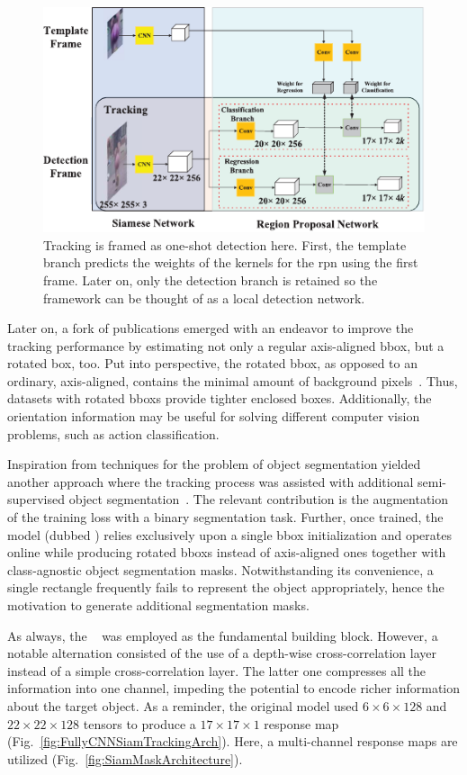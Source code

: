 \begin{figure}[t]
    \centerline{\includegraphics[width=0.7\linewidth]{figures/theoretical_foundations/siam_rpn_one_shot_detection.pdf}}
    \caption[Tracking as one-shot detection]{Tracking is framed as one-shot detection here. First, the template branch predicts the weights of the kernels for the \gls{rpn} using the first frame. Later on, only the detection branch is retained so the framework can be thought of as a local detection network. }
    \label{fig:SiamRPNOneShotDetection}
\end{figure}

Later on, a fork of publications emerged with an endeavor to improve the tracking performance by estimating not only a regular axis-aligned \gls{bbox}, but a rotated box, too. Put into perspective, the rotated \gls{bbox}, as opposed to an ordinary, axis-aligned, contains the minimal amount of background pixels~\cite{Chen2019}. Thus, datasets with rotated \glspl{bbox} provide tighter enclosed boxes. Additionally, the orientation information may be useful for solving different computer vision problems, such as action classification.

Inspiration from techniques for the problem of object segmentation yielded another approach where the tracking process was assisted with additional semi-supervised object segmentation~\cite{Wang2019}. The relevant contribution is the augmentation of the training loss with a binary segmentation task. Further, once trained, the model (dubbed ) relies exclusively upon a single \gls{bbox} initialization and operates online while producing rotated \glspl{bbox} instead of axis-aligned ones together with class-agnostic object segmentation masks. Notwithstanding its convenience, a single rectangle frequently fails to represent the object appropriately, hence the motivation to generate additional segmentation masks.

As always, the ~\cite{Bertinetto2016} was employed as the fundamental building block. However, a notable alternation consisted of the use of a depth-wise cross-correlation layer instead of a simple cross-correlation layer. The latter one compresses all the information into one channel, impeding the potential to encode richer information about the target object. As a reminder, the original model used $6 \times 6 \times 128$ and $22 \times 22 \times 128$ tensors to produce a $17 \times 17 \times 1$ response map (Fig.~\ref{fig:FullyCNNSiamTrackingArch}). Here, a multi-channel response maps are utilized (Fig.~\ref{fig:SiamMaskArchitecture}).

